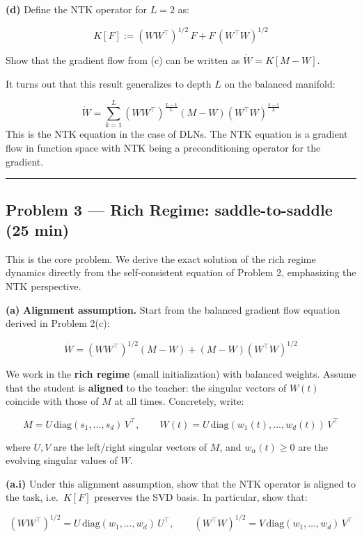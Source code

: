 \documentclass[
]{article}
\begin{document}
\textbf{(d)} Define the NTK operator for \(L = 2\) as:

\[K[F] := (WW^\top)^{1/2}\, F + F\, (W^\top W)^{1/2}\]

Show that the gradient flow from (c) can be written as
\(\dot{W} = K[M - W]\).

It turns out that this result generalizes to depth \(L\) on the balanced
manifold:

\[\dot{W} = \sum_{k=1}^{L} (WW^\top)^{\frac{L-k}{L}} (M - W) (W^\top W)^{\frac{k-1}{L}}\]
This is the NTK equation in the case of DLNs. The NTK equation is a gradient flow in function space with NTK being a preconditioning operator for the gradient.
\begin{center}\rule{0.5\linewidth}{0.5pt}\end{center}

\subsection{Problem 3 --- Rich Regime: saddle-to-saddle (25
min)}\label{problem-3-rich-regime-incremental-learning-25-min}

This is the core problem. We derive the exact solution of the rich
regime dynamics directly from the self-consistent equation of Problem 2,
emphasizing the NTK perspective.

\textbf{(a)} \textbf{Alignment assumption.} Start from the balanced
gradient flow equation derived in Problem 2(c):

\[\dot{W} = (WW^\top)^{1/2}(M - W) + (M - W)(W^\top W)^{1/2}\]

We work in the \textbf{rich regime} (small initialization) with balanced
weights. Assume that the student is \textbf{aligned} to the teacher: the
singular vectors of \(W(t)\) coincide with those of \(M\) at all times.
Concretely, write:

\[M = U\,\text{diag}(s_1, \ldots, s_d)\,V^\top, \qquad W(t) = U\,\text{diag}(w_1(t), \ldots, w_d(t))\,V^\top\]

where \(U, V\) are the left/right singular vectors of \(M\), and
\(w_\alpha(t) \geq 0\) are the evolving singular values of \(W\).

\textbf{(a.i)} Under this alignment assumption, show that the NTK
operator is aligned to the task, i.e.~\(K[F]\) preserves the SVD basis.
In particular, show that:

\[(WW^\top)^{1/2} = U\,\text{diag}(w_1, \ldots, w_d)\,U^\top, \qquad (W^\top W)^{1/2} = V\,\text{diag}(w_1, \ldots, w_d)\,V^\top\]
\end{document}
